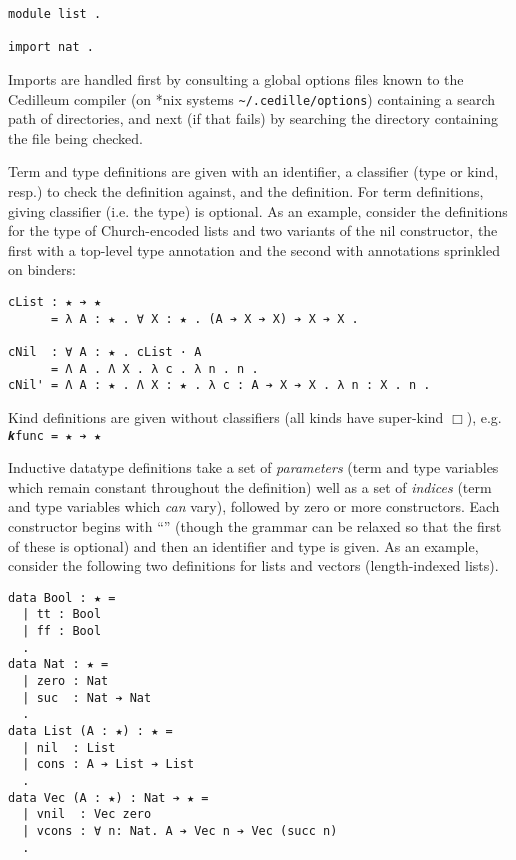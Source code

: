 \documentclass{article}
\begin{document}
\begin{verbatim}
module list .

import nat .
\end{verbatim}

\noindent Imports are handled first by consulting a global options files
known to the Cedilleum compiler (on *nix systems \verb|~/.cedille/options|)
containing a search path of directories, and next (if that fails) by searching
the directory containing the file being checked.

Term and type definitions are given with an identifier, a classifier (type or
kind, resp.) to check the definition against, and the definition. For term
definitions, giving classifier (i.e. the type) is optional. As an example,
consider the definitions for the type of Church-encoded lists and two variants
of the nil constructor, the first with a top-level type annotation and the
second with annotations sprinkled on binders:

\begin{verbatim}
cList : ★ ➔ ★
      = λ A : ★ . ∀ X : ★ . (A ➔ X ➔ X) ➔ X ➔ X .

cNil  : ∀ A : ★ . cList · A
      = Λ A . Λ X . λ c . λ n . n .
cNil' = Λ A : ★ . Λ X : ★ . λ c : A ➔ X ➔ X . λ n : X . n .
\end{verbatim}

Kind definitions are given without classifiers (all kinds have super-kind
$\Box$), e.g. \verb;𝒌func = ★ ➔ ★;

Inductive datatype definitions take a set of \textit{parameters} (term and type
variables which remain constant throughout the definition) well as a set of
\textit{indices} (term and type variables which \textit{can} vary), followed by
zero or more constructors. Each constructor begins with ``\textbf{\textbar}''
(though the grammar can be relaxed so that the first of these is optional) and
then an identifier and type is given. As an example, consider the following two
definitions for lists and vectors (length-indexed lists).

\begin{verbatim}
data Bool : ★ =
  | tt : Bool
  | ff : Bool
  .
data Nat : ★ =
  | zero : Nat
  | suc  : Nat ➔ Nat
  .
data List (A : ★) : ★ =
  | nil  : List
  | cons : A ➔ List ➔ List
  .
data Vec (A : ★) : Nat ➔ ★ =
  | vnil  : Vec zero
  | vcons : ∀ n: Nat. A ➔ Vec n ➔ Vec (succ n)
  .
\end{verbatim}
\end{document}
